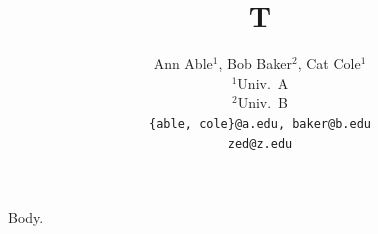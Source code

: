 \documentclass{article}
\title{T}
\author{Ann Able$^{1}$, Bob Baker$^{2}$, Cat Cole$^{1}$\\ $^{1}$Univ.\ A\\ $^{2}$Univ.\ B\\
  \texttt{\{able, cole\}@a.edu, baker@b.edu}\\ \texttt{zed@z.edu}}
\begin{document}
\maketitle
Body.
\end{document}
